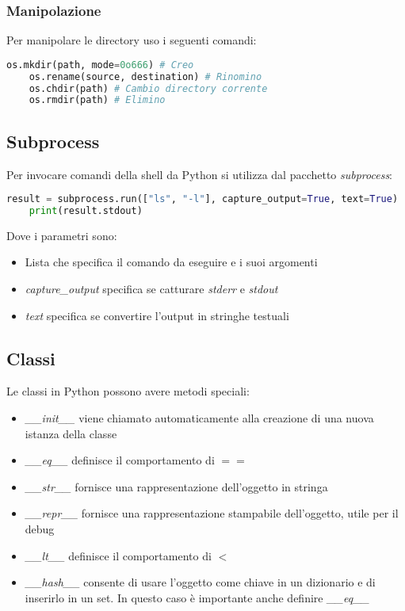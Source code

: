 \subsubsection{Manipolazione}
Per manipolare le directory uso i seguenti comandi:
\begin{lstlisting}[language=Python]
	os.mkdir(path, mode=0o666) # Creo
	os.rename(source, destination) # Rinomino
	os.chdir(path) # Cambio directory corrente
	os.rmdir(path) # Elimino
\end{lstlisting}

\subsection{Subprocess}
Per invocare comandi della shell da Python si utilizza dal pacchetto \textit{subprocess}:
\begin{lstlisting}[language=Python]
	result = subprocess.run(["ls", "-l"], capture_output=True, text=True)
	print(result.stdout)
\end{lstlisting}
Dove i parametri sono:
\begin{itemize}
	\item Lista che specifica il comando da eseguire e i suoi argomenti
	\item \textit{capture\_output} specifica se catturare \textit{stderr} e \textit{stdout}
	\item \textit{text} specifica se convertire l'output in stringhe testuali
\end{itemize}

\subsection{Classi}
Le classi in Python possono avere metodi speciali:
\begin{itemize}
	\item \textit{\_\_init\_\_} viene chiamato automaticamente alla creazione di una nuova istanza della classe
	\item \textit{\_\_eq\_\_} definisce il comportamento di $==$
	\item \textit{\_\_str\_\_} fornisce una rappresentazione dell'oggetto in stringa
	\item \textit{\_\_repr\_\_} fornisce una rappresentazione stampabile dell'oggetto, utile per il debug
	\item \textit{\_\_lt\_\_} definisce il comportamento di $<$
	\item \textit{\_\_hash\_\_} consente di usare l'oggetto come chiave in un dizionario e di inserirlo in un set. In questo caso è importante anche definire \textit{\_\_eq\_\_}
\end{itemize}

